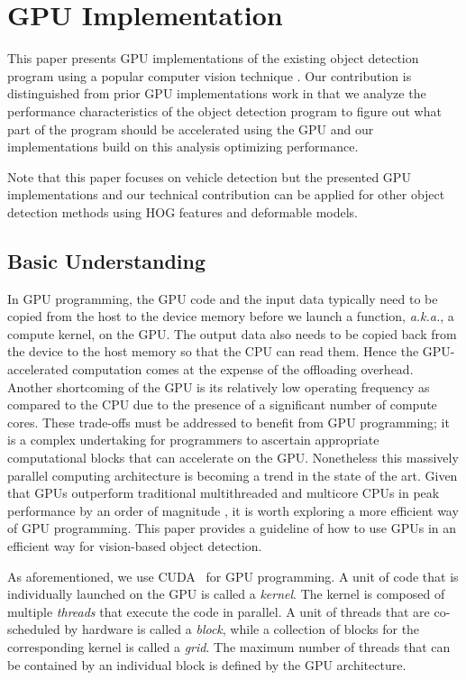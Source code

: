 \section{GPU Implementation}
\label{sec:implementation}

This paper presents GPU implementations of the existing object
detection program using a popular computer vision technique
\cite{Niknejad12}.
Our contribution is distinguished from prior GPU implementations work
\cite{Chen11, Prisacariu09} in that we analyze the performance
characteristics of the object detection program to figure out what part
of the program should be accelerated using the GPU and our
implementations build on this analysis optimizing performance.

Note that this paper focuses on vehicle detection but the presented GPU
implementations and our technical contribution can be applied for other
object detection methods using HOG features and deformable models.

\subsection{Basic Understanding}
\label{sec:understanding}

In GPU programming, the GPU code and the input data typically need to be
copied from the host to the device memory before we launch a function,
\textit{a.k.a.}, a compute kernel, on the GPU.
The output data also needs to be copied back from the device to the host
memory so that the CPU can read them.
Hence the GPU-accelerated computation comes at the expense of the
offloading overhead.
Another shortcoming of the GPU is its relatively low operating frequency
as compared to the CPU due to the presence of a significant number of
compute cores.
These trade-offs must be addressed to benefit from GPU programming; it
is a complex undertaking for programmers to ascertain appropriate
computational blocks that can accelerate on the GPU.
Nonetheless this massively parallel computing architecture is becoming a
trend in the state of the art.
Given that GPUs outperform traditional multithreaded and multicore CPUs
in peak performance by an order of magnitude \cite{Kato13_2}, it is
worth exploring a more efficient way of GPU programming.
This paper provides a guideline of how to use GPUs in an efficient way
for vision-based object detection.

As aforementioned, we use CUDA~\cite{NVIDIA_CUDA} for GPU programming.
A unit of code that is individually launched on the GPU is called
a \textit{kernel}.
The kernel is composed of multiple \textit{threads} that execute the
code in parallel.
A unit of threads that are co-scheduled by hardware is called a
\textit{block}, while a collection of blocks for the corresponding
kernel is called a \textit{grid}.  
The maximum number of threads that can be contained by an individual
block is defined by the GPU architecture.

